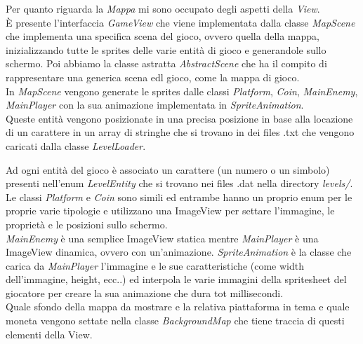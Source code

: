 \textsf{\small Per quanto riguarda la \emph{Mappa} mi sono occupato degli aspetti della \emph{View}.}\\

\textsf{\small È presente l'interfaccia \emph{GameView} che viene implementata dalla classe \emph{MapScene} che implementa una specifica scena del gioco, ovvero quella della mappa, inizializzando tutte le sprites delle varie entità di gioco e generandole sullo schermo. Poi abbiamo la classe astratta \emph{AbstractScene} che ha il compito di rappresentare una generica scena edl gioco, come la mappa di gioco.} \\

\textsf{\small In \emph{MapScene} vengono generate le sprites dalle classi \emph{Platform}, \emph{Coin}, \emph{MainEnemy}, \emph{MainPlayer} con la sua animazione implementata in \emph{SpriteAnimation}.}\\

\textsf{\small Queste entità vengono posizionate in una precisa posizione in base alla locazione di un carattere in un array di stringhe che si trovano in dei files .txt che vengono caricati dalla classe \emph{LevelLoader}.} %

\textsf{\small Ad ogni entità del gioco è associato un carattere (un numero o un simbolo) presenti nell'enum \emph{LevelEntity} che si trovano nei files .dat nella directory \emph{levels/}.}\\

\textsf{\small Le classi \emph{Platform} e \emph{Coin} sono simili ed entrambe hanno un proprio enum per le proprie varie tipologie e utilizzano una ImageView per settare l'immagine, le proprietà e le posizioni sullo schermo.}\\

\textsf{\small \emph{MainEnemy} è una semplice ImageView statica mentre \emph{MainPlayer} è una ImageView dinamica, ovvero con un'animazione.}
\textsf{\small \emph{SpriteAnimation} è la classe che carica da \emph{MainPlayer} l'immagine e le sue caratteristiche (come width dell'immagine, height, ecc..) ed interpola le varie immagini della spritesheet del giocatore per creare la sua animazione che dura tot millisecondi.}\\

\textsf{\small  Quale sfondo della mappa da mostrare e la relativa piattaforma in tema e quale moneta vengono settate nella classe \emph{BackgroundMap} che tiene traccia di questi elementi della View.}\\


